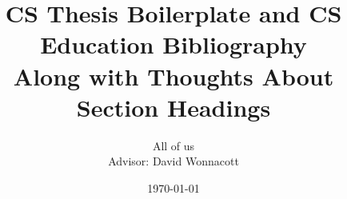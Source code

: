 \documentclass{article}
\title{CS Thesis Boilerplate and CS Education Bibliography\\
       {\Large Along with Thoughts About Section Headings}}
\author{All of us\\
        {Advisor: David Wonnacott}}
\date{\today}
\begin{document}
\sloppy  %

\maketitle











\end{document}
